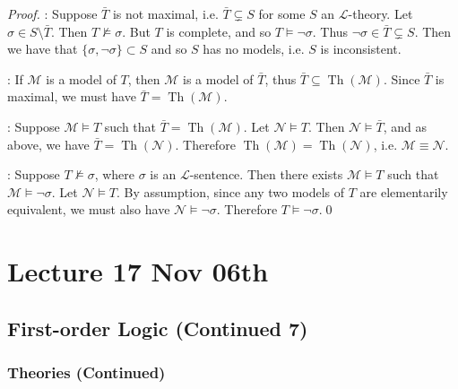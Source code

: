 \documentclass[notoc,notitlepage]{tufte-book}
\DeclareMathOperator{\Th}{Th }
\begin{document}
\begin{proof}
  : Suppose $\bar{T}$ is not maximal, i.e. $\bar{T} \subsetneq S$  for some $S$ an $\mathcal{L}$-theory. Let $\sigma \in S \setminus \bar{T}$. Then $T \not\models \sigma$. But $T$ is complete, and so $T \models \neg \sigma$. Thus $\neg \sigma \in \bar{T} \subsetneq S$. Then we have that $\{ \sigma, \neg \sigma \} \subset S$ and so $S$ has no models, i.e. $S$ is inconsistent.

  \noindent{}: If $\mathcal{M}$ is a model of $T$, then $\mathcal{M}$ is a model of $\bar{T}$, thus $\bar{T} \subseteq \Th(\mathcal{M})$. Since $\bar{T}$ is maximal, we must have $\bar{T} = \Th(\mathcal{M})$.

  \noindent{}: Suppose $\mathcal{M} \models T$ such that $\bar{T} = \Th(\mathcal{M})$. Let $\mathcal{N} \models T$. Then $\mathcal{N} \models \bar{T}$, and as above, we have $\bar{T} = \Th(\mathcal{N})$. Therefore $\Th(\mathcal{M}) = \Th(\mathcal{N})$, i.e. $\mathcal{M} \equiv \mathcal{N}$.

  \noindent{}: Suppose $T \not\models \sigma$, where $\sigma$ is an $\mathcal{L}$-sentence. Then there exists $\mathcal{M} \models T$ such that $\mathcal{M} \models \neg \sigma$. Let $\mathcal{N} \models T$. By assumption, since any two models of $T$ are elementarily equivalent, we must also have $\mathcal{N} \models \neg \sigma$. Therefore $T \models \neg \sigma$.\qed\
\end{proof}




\chapter{Lecture 17 Nov 06th}%
\label{chp:lecture_17_nov_06th}

\section{First-order Logic (Continued 7)}%
\label{sec:first_order_logic_continued_7}

\subsection{Theories (Continued)}%
\label{sub:theories_continued}
\end{document}
